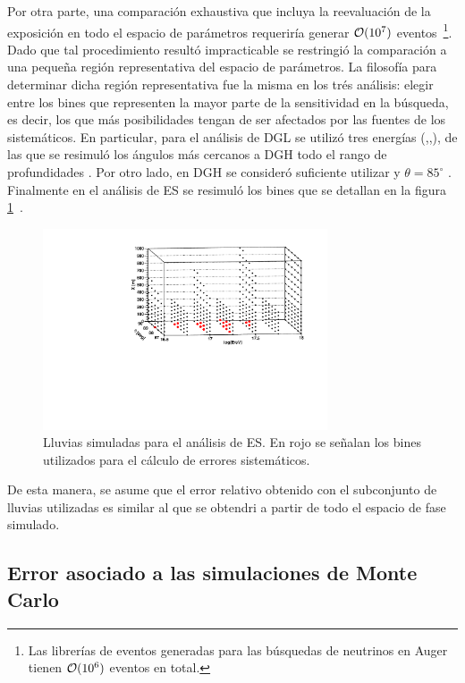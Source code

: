 	Por otra parte, una comparación exhaustiva que incluya la reevaluación de la exposición en todo el espacio de parámetros requeriría generar ${\cal O}(10^7)$ eventos~\footnote{Las librerías de eventos generadas para las búsquedas de neutrinos en Auger tienen ${\cal O}(10^6)$ eventos en total.}. 
	Dado que tal procedimiento result\'o impracticable se restringi\'o la comparación a una pequeña región representativa del espacio de parámetros. 
	La filosofía para determinar dicha región representativa fue la misma en los trés análisis: elegir entre los bines que representen la mayor parte de la sensitividad en la búsqueda, es decir, los que más posibilidades tengan de ser afectados por las fuentes de los sistemáticos.
	En particular, para el análisis de DGL se utilizó tres energías (,,), de las que se resimuló los ángulos más cercanos a DGH todo el rango de profundidades \cite{tesisNavarro}.
	Por otro lado, en DGH se consideró suficiente utilizar  y $\theta=85^\circ$ \cite{tesisJavier}.
	Finalmente en el análisis de ES se resimuló los bines que se detallan en la figura \ref{fig:importantBins_oldWeights}~\cite{tesisYann}.
	\begin{figure}[ht!]
		\begin{center}
			\includegraphics[width=0.75\textwidth]{fig/resultadosAuger/importantBins_oldWeights}
			\caption{Lluvias simuladas para el análisis de ES. En rojo se señalan los bines utilizados para el cálculo de errores sistemáticos.}
			\label{fig:importantBins_oldWeights}
		\end{center}
	\end{figure}
	De esta manera, se asume que el error relativo obtenido con el subconjunto de lluvias utilizadas es similar al que se obtendri a partir de todo el espacio de fase simulado.
	
	\subsection{Error asociado a las simulaciones de Monte Carlo}
	
